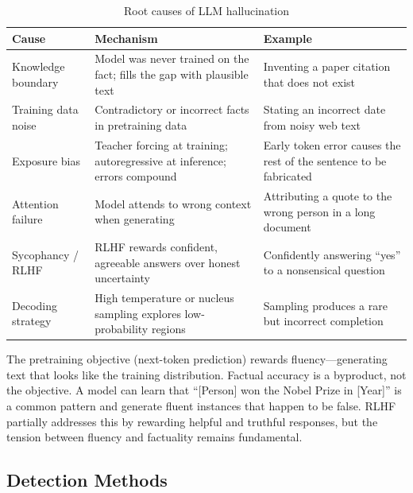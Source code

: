 \begin{table}[H]
\centering
\caption{Root causes of LLM hallucination}
\begin{tabularx}{\textwidth}{lXX}
\toprule
\textbf{Cause} & \textbf{Mechanism} & \textbf{Example} \\
\midrule
Knowledge boundary & Model was never trained on the fact; fills the gap with plausible text & Inventing a paper citation that does not exist \\
Training data noise & Contradictory or incorrect facts in pretraining data & Stating an incorrect date from noisy web text \\
Exposure bias & Teacher forcing at training; autoregressive at inference; errors compound & Early token error causes the rest of the sentence to be fabricated \\
Attention failure & Model attends to wrong context when generating & Attributing a quote to the wrong person in a long document \\
Sycophancy / RLHF & RLHF rewards confident, agreeable answers over honest uncertainty & Confidently answering ``yes'' to a nonsensical question \\
Decoding strategy & High temperature or nucleus sampling explores low-probability regions & Sampling produces a rare but incorrect completion \\
\bottomrule
\end{tabularx}
\end{table}

\begin{keyinsight}
The pretraining objective (next-token prediction) rewards fluency---generating text that looks like the training distribution. Factual accuracy is a byproduct, not the objective. A model can learn that ``[Person] won the Nobel Prize in [Year]'' is a common pattern and generate fluent instances that happen to be false. RLHF partially addresses this by rewarding helpful and truthful responses, but the tension between fluency and factuality remains fundamental.
\end{keyinsight}

\subsection{Detection Methods}


